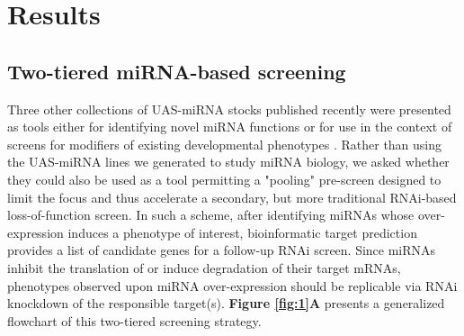 \section*{Results}

\subsection*{Two-tiered miRNA-based screening}

Three other collections of UAS-miRNA stocks published recently were presented as tools either for identifying novel miRNA functions \cite{aleigh_Kim_Ni_Duan_et_al__2012,shauser_Forstemann_Basler_2012} or for use in the context of screens for modifiers of existing developmental phenotypes \cite{gler_Lim_Verma_Chen_Cohen_2012}.
Rather than using the UAS-miRNA lines we generated \cite{Suh_2015} to study miRNA biology, we asked whether they could also be used as a tool permitting a "pooling" pre-screen designed to limit the focus and thus accelerate a secondary, but more traditional RNAi-based loss-of-function screen.
In such a scheme, after identifying miRNAs whose over-expression induces a phenotype of interest, bioinformatic target prediction provides a list of candidate genes for a follow-up RNAi screen.
Since miRNAs inhibit the translation of or induce degradation of their target mRNAs, phenotypes observed upon miRNA over-expression should be replicable via RNAi knockdown of the responsible target(s).
\textbf{Figure \ref{fig:1}A} presents a generalized flowchart of this two-tiered screening strategy.